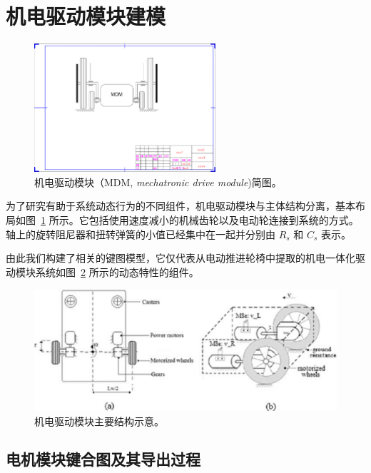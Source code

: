 \newpage
\section{机电驱动模块建模}

\begin{figure}[!h]
	\centering
	\includegraphics[width=0.6\textwidth]{fig/MDM_modified.pdf}
	\caption{机电驱动模块（MDM, \textit{mechatronic drive module})简图。}\label{fig:MDM_modified} %
\end{figure}

为了研究有助于系统动态行为的不同组件，机电驱动模块与主体结构分离，基本布局如图~\ref{fig:MDM_modified} 所示。它包括使用速度减小的机械齿轮以及电动轮连接到系统的方式。轴上的旋转阻尼器和扭转弹簧的小值已经集中在一起并分别由 $R_s$ 和 $C_s$ 表示。

由此我们构建了相关的键图模型，它仅代表从电动推进轮椅中提取的机电一体化驱动模块系统如图~\ref{fig:MDM_scheme} 所示的动态特性的组件。

\begin{figure}[!h]
	\centering
	\includegraphics[width=1\textwidth]{fig/MDM_scheme.png}
	\caption{机电驱动模块主要结构示意。}\label{fig:MDM_scheme} %
\end{figure}

\subsection{电机模块键合图及其导出过程}

